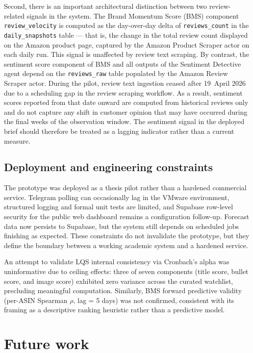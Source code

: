 Second, there is an important architectural distinction between two review-related signals in the system. The Brand Momentum Score (BMS) component \texttt{review\_velocity} is computed as the day-over-day delta of \texttt{reviews\_count} in the \texttt{daily\_snapshots} table --- that is, the change in the total review count displayed on the Amazon product page, captured by the Amazon Product Scraper actor on each daily run. This signal is unaffected by review text scraping. By contrast, the sentiment score component of BMS and all outputs of the Sentiment Detective agent depend on the \texttt{reviews\_raw} table populated by the Amazon Review Scraper actor. During the pilot, review text ingestion ceased after 19~April 2026 due to a scheduling gap in the review scraping workflow. As a result, sentiment scores reported from that date onward are computed from historical reviews only and do not capture any shift in customer opinion that may have occurred during the final weeks of the observation window. The sentiment signal in the deployed brief should therefore be treated as a lagging indicator rather than a current measure.

\subsection{Deployment and engineering constraints}

The prototype was deployed as a thesis pilot rather than a hardened commercial service. Telegram polling can occasionally lag in the VMware environment, structured logging and formal unit tests are limited, and Supabase row-level security for the public web dashboard remains a configuration follow-up. Forecast data now persists to Supabase, but the system still depends on scheduled jobs finishing as expected. These constraints do not invalidate the prototype, but they define the boundary between a working academic system and a hardened service.

An attempt to validate LQS internal consistency via Cronbach's alpha was uninformative due to ceiling effects: three of seven components (title score, bullet score, and image score) exhibited zero variance across the curated watchlist, precluding meaningful computation. Similarly, BMS forward predictive validity (per-ASIN Spearman $\rho$, lag = 5 days) was not confirmed, consistent with its framing as a descriptive ranking heuristic rather than a predictive model.

\section{Future work}


